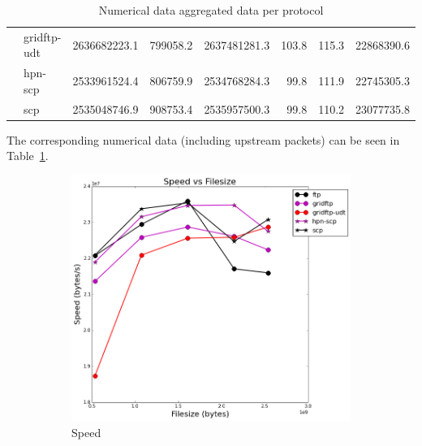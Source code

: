 \documentclass{sig-alternate-05-2015}
\begin{document}
\begin{table}[t]
\begin{tabular}{rlrrrrrr}
	           &  gridftp-udt & 2636682223.1 &   799058.2 & 2637481281.3 &      103.8 &     115.3 &       22868390.6 \\
	           &      hpn-scp & 2533961524.4 &   806759.9 & 2534768284.3 &       99.8 &     111.9 &       22745305.3 \\
	           &          scp & 2535048746.9 &   908753.4 & 2535957500.3 &       99.8 &     110.2 &       23077735.8 \\
	\bottomrule
	\end{tabular}
\caption{Numerical data aggregated data per protocol}
\label{tab:aggregate}
\end{table}

The corresponding numerical data (including upstream packets) can be seen in Table~\ref{tab:aggregate}.

\begin{figure}
\centering
	\begin{subfigure}{.45\textwidth}
	\includegraphics[width=\textwidth]{img/per_filesize/speed.png}
	\caption{Speed}
	\label{fig:per_fs_speed}
	\end{subfigure}
	\begin{subfigure}{.45\textwidth}

\end{subfigure}
\end{figure}
\end{document}
